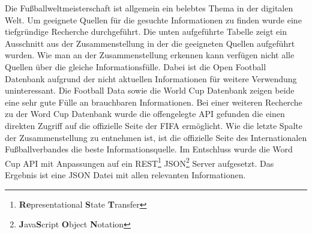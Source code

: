 \documentclass[runningheads,a4paper]{llncs}
\begin{document}
Die Fußballweltmeisterschaft ist allgemein ein belebtes Thema in der digitalen Welt. Um geeignete Quellen für die gesuchte Informationen zu finden wurde eine tiefgründige Recherche durchgeführt. Die unten aufgeführte Tabelle zeigt ein Ausschnitt aus der Zusammenstellung in der die geeigneten Quellen aufgeführt wurden. Wie man an der Zusammenstellung erkennen kann verfügen nicht alle Quellen über die gleiche Informationsfülle. Dabei ist die Open Football \cite{url_openfootball} Datenbank aufgrund der nicht aktuellen Informationen für weitere Verwendung uninteressant. Die Football Data \cite{url_footballdata} sowie die World Cup \cite{url_worldcup} Datenbank zeigen beide eine sehr gute Fülle an brauchbaren Informationen. Bei einer weiteren Recherche zu der Word Cup Datenbank wurde die offengelegte API gefunden die einen direkten Zugriff auf die offizielle Seite der FIFA ermöglicht. Wie die letzte Spalte der Zusammenstellung zu entnehmen ist, ist die offizielle Seite des Internationalen Fußballverbandes die beste Informationsquelle. Im Entschluss wurde die Word Cup API mit Anpassungen auf ein REST\footnote{\textbf{Re}presentational \textbf{S}tate \textbf{T}ransfer} JSON\footnote{\textbf{J}ava\textbf{S}cript \textbf{O}bject \textbf{N}otation} Server aufgesetzt. Das Ergebnis ist eine JSON Datei mit allen relevanten Informationen.
\end{document}
